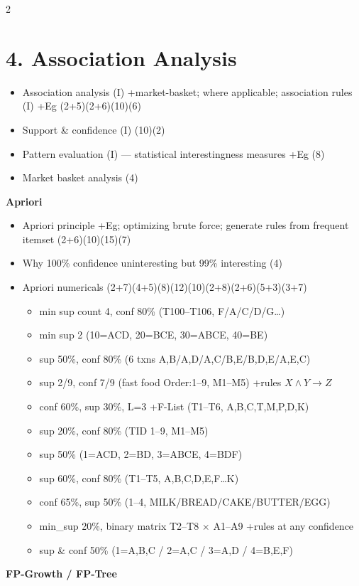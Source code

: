 \documentclass[10pt]{article}
\begin{document}
\begin{multicols}{2}
\section*{4. Association Analysis}
\begin{itemize}
  \item Association analysis (I) +market-basket; where applicable; association rules (I) +Eg \hfill (2+5)(2+6)(10)(6)
  \item Support \& confidence (I) \hfill (10)(2)
  \item Pattern evaluation (I) --- statistical interestingness measures +Eg \hfill (8)
  \item Market basket analysis \hfill (4)
\end{itemize}
\textbf{Apriori}
\begin{itemize}
  \item Apriori principle +Eg; optimizing brute force; generate rules from frequent itemset \hfill (2+6)(10)(15)(7)
  \item Why 100\% confidence uninteresting but 99\% interesting \hfill (4)
  \item Apriori numericals \hfill (2+7)(4+5)(8)(12)(10)(2+8)(2+6)(5+3)(3+7)
    \begin{itemize}
      \item min sup count 4, conf 80\% (T100--T106, F/A/C/D/G\dots)
      \item min sup 2 (10=ACD, 20=BCE, 30=ABCE, 40=BE)
      \item sup 50\%, conf 80\% (6 txns A,B/A,D/A,C/B,E/B,D,E/A,E,C)
      \item sup 2/9, conf 7/9 (fast food Order:1--9, M1--M5) +rules $X\wedge Y\to Z$
      \item conf 60\%, sup 30\%, L=3 +F-List (T1--T6, A,B,C,T,M,P,D,K)
      \item sup 20\%, conf 80\% (TID 1--9, M1--M5)
      \item sup 50\% (1=ACD, 2=BD, 3=ABCE, 4=BDF)
      \item sup 60\%, conf 80\% (T1--T5, A,B,C,D,E,F\dots K)
      \item conf 65\%, sup 50\% (1--4, MILK/BREAD/CAKE/BUTTER/EGG)
      \item min\_sup 20\%, binary matrix T2--T8 $\times$ A1--A9 +rules at any confidence
      \item sup \& conf 50\% (1=A,B,C / 2=A,C / 3=A,D / 4=B,E,F)
    \end{itemize}
\end{itemize}
\textbf{FP-Growth / FP-Tree}
\begin{itemize}

\end{itemize}
\end{multicols}
\end{document}
